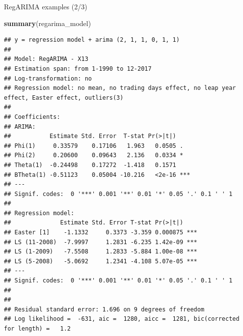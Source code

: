 \documentclass[10pt,xcolor=table,color={dvipsnames,usenames},ignorenonframetext,usepdftitle=false,french]{beamer}
\newenvironment{Shaded}{\begin{snugshade}}{\end{snugshade}}
\newcommand{\KeywordTok}[1]{\textcolor[rgb]{0.13,0.29,0.53}{\textbf{#1}}}
\newcommand{\NormalTok}[1]{#1}
\begin{document}
\begin{frame}[fragile]{RegARIMA examples (2/3)}
\protect\hypertarget{regarima-examples-23}{}

\footnotesize

\begin{Shaded}
\begin{Highlighting}[]
\KeywordTok{summary}\NormalTok{(regarima_model)}
\end{Highlighting}
\end{Shaded}

\begin{verbatim}
## y = regression model + arima (2, 1, 1, 0, 1, 1)
## 
## Model: RegARIMA - X13
## Estimation span: from 1-1990 to 12-2017
## Log-transformation: no
## Regression model: no mean, no trading days effect, no leap year effect, Easter effect, outliers(3)
## 
## Coefficients:
## ARIMA: 
##           Estimate Std. Error  T-stat Pr(>|t|)    
## Phi(1)     0.33579    0.17106   1.963   0.0505 .  
## Phi(2)     0.20600    0.09643   2.136   0.0334 *  
## Theta(1)  -0.24498    0.17272  -1.418   0.1571    
## BTheta(1) -0.51123    0.05004 -10.216   <2e-16 ***
## ---
## Signif. codes:  0 '***' 0.001 '**' 0.01 '*' 0.05 '.' 0.1 ' ' 1
## 
## Regression model: 
##              Estimate Std. Error T-stat Pr(>|t|)    
## Easter [1]    -1.1332     0.3373 -3.359 0.000875 ***
## LS (11-2008)  -7.9997     1.2831 -6.235 1.42e-09 ***
## LS (1-2009)   -7.5508     1.2833 -5.884 1.00e-08 ***
## LS (5-2008)   -5.0692     1.2341 -4.108 5.07e-05 ***
## ---
## Signif. codes:  0 '***' 0.001 '**' 0.01 '*' 0.05 '.' 0.1 ' ' 1
## 
## 
## Residual standard error: 1.696 on 9 degrees of freedom
## Log likelihood =  -631, aic =  1280, aicc =  1281, bic(corrected for length) =   1.2
\end{verbatim}

\end{frame}
\end{document}
